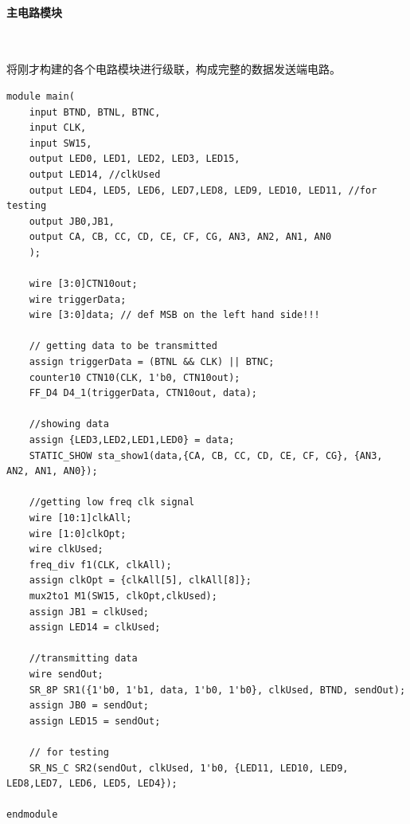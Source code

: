 \documentclass[UTF8]{ctexart}
\numberwithin{figure}{subsection}
\numberwithin{table}{subsection}
\numberwithin{equation}{subsection}
\begin{document}
\paragraph{主电路模块}~
\par 将刚才构建的各个电路模块进行级联，构成完整的数据发送端电路。
\begin{lstlisting}[style={verilog-style}]
module main(
    input BTND, BTNL, BTNC,
    input CLK,
    input SW15,
    output LED0, LED1, LED2, LED3, LED15,  
    output LED14, //clkUsed
    output LED4, LED5, LED6, LED7,LED8, LED9, LED10, LED11, //for testing
    output JB0,JB1,
    output CA, CB, CC, CD, CE, CF, CG, AN3, AN2, AN1, AN0
    );
    
    wire [3:0]CTN10out;
    wire triggerData;
    wire [3:0]data; // def MSB on the left hand side!!!

    // getting data to be transmitted
    assign triggerData = (BTNL && CLK) || BTNC;
    counter10 CTN10(CLK, 1'b0, CTN10out);
    FF_D4 D4_1(triggerData, CTN10out, data);

    //showing data
    assign {LED3,LED2,LED1,LED0} = data;
    STATIC_SHOW sta_show1(data,{CA, CB, CC, CD, CE, CF, CG}, {AN3, AN2, AN1, AN0});

    //getting low freq clk signal
    wire [10:1]clkAll;
    wire [1:0]clkOpt;
    wire clkUsed;
    freq_div f1(CLK, clkAll);
    assign clkOpt = {clkAll[5], clkAll[8]};
    mux2to1 M1(SW15, clkOpt,clkUsed);
    assign JB1 = clkUsed;
    assign LED14 = clkUsed;

    //transmitting data
    wire sendOut;
    SR_8P SR1({1'b0, 1'b1, data, 1'b0, 1'b0}, clkUsed, BTND, sendOut);
    assign JB0 = sendOut;
    assign LED15 = sendOut;

    // for testing
    SR_NS_C SR2(sendOut, clkUsed, 1'b0, {LED11, LED10, LED9, LED8,LED7, LED6, LED5, LED4});

endmodule
\end{lstlisting}
\end{document}
